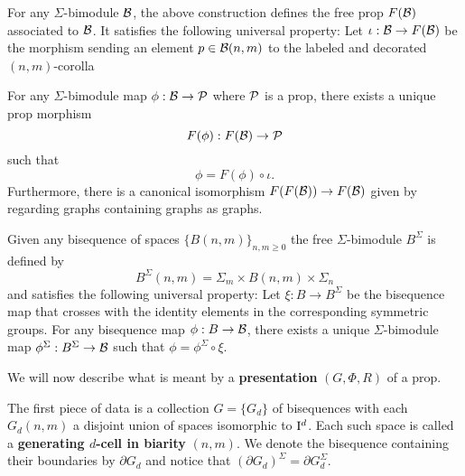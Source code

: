 For any $\Sigma$-bimodule $\B$, the above construction defines the free prop $F(\B)$ associated to $\B$. It satisfies the following universal property: Let $\iota : \B \to F(\B)$ be the morphism sending an element $p \in \B(n,m)$ to the labeled and decorated $(n,m)$-corolla
\begin{center}
\end{center}
For any $\Sigma$-bimodule map $\phi : \B \to \P$ where $\P$ is a prop, there exists a unique prop morphism 
\begin{equation*}
F(\phi) : F(\B) \to \P
\end{equation*} 
such that 
\begin{equation*}
\phi = F(\phi) \circ \iota.
\end{equation*}
Furthermore, there is a canonical isomorphism $F(F(\B)) \to F(\B)$ given by regarding graphs containing graphs as graphs.

Given any bisequence of spaces $\big\{ B(n,m) \big\}_{n,m \geq 0}$ the free $\Sigma$-bimodule $B^\Sigma$ is defined by 
\begin{equation*}
B^\Sigma(n,m) = \Sigma_m \times B(n,m) \times \Sigma_n
\end{equation*}
and satisfies the following universal property: Let $\xi : B \to B^\Sigma$ be the bisequence map that crosses with the identity elements in the corresponding symmetric groups. For any bisequence map $\phi : B \to \B$, there exists a unique $\Sigma$-bimodule map $\phi^\Sigma : B^\Sigma \to \B$ such that $\phi = \phi^\Sigma \circ \xi$.

We will now describe what is meant by a \textbf{presentation} $(G,\Phi, R)$ of a prop. 

The first piece of data is a collection $G=\{G_d\}$ of bisequences with each $G_d(n,m)$ a disjoint union of spaces isomorphic to $\I^d$. Each such space is called a \textbf{generating $d$-cell in biarity} $(n,m)$. We denote the bisequence containing their boundaries by $\partial G_d$ and notice that $(\partial G_d)^\Sigma = \partial G_d^\Sigma$. 

